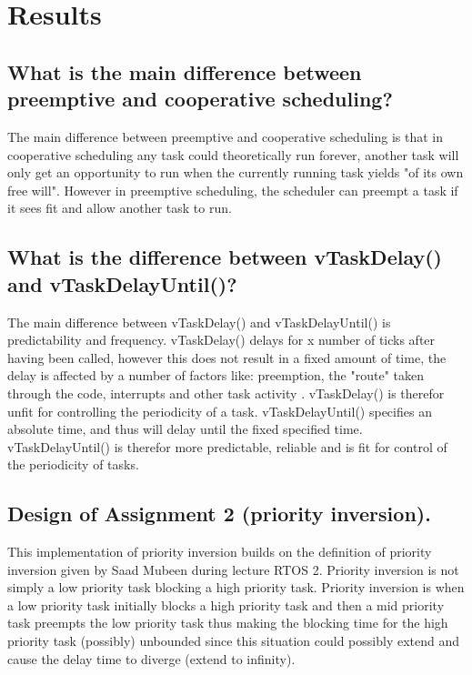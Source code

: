 \section{Results}
\label{section:results}

\subsection{What is the main difference between preemptive and cooperative scheduling?}
The main difference between preemptive and cooperative scheduling is that in cooperative scheduling any task could theoretically run forever, another task will only get an opportunity to run when the currently running task yields "of its own free will". However in preemptive scheduling, the scheduler can preempt a task if it sees fit and allow another task to run.

\subsection{What is the difference between vTaskDelay() and vTaskDelayUntil()?}
The main difference between vTaskDelay() and vTaskDelayUntil() is predictability and frequency. vTaskDelay() delays for x number of ticks after having been called, however this does not result in a fixed amount of time, the delay is affected by a number of factors like: preemption, the "route" taken through the code, interrupts and other task activity \cite{VTaskDelay2023}\cite{VTaskDelayUntil2023}. vTaskDelay() is therefor unfit for controlling the periodicity of a task. vTaskDelayUntil() specifies an absolute time, and thus will delay until the fixed specified time. vTaskDelayUntil() is therefor more predictable, reliable and is fit for control of the periodicity of tasks.

\subsection{Design of Assignment 2 (priority inversion).}
This implementation of priority inversion builds on the definition of priority inversion given by Saad Mubeen during lecture RTOS 2\cite{mubeenLectureRTOSII2023}. Priority inversion is not simply a low priority task blocking a high priority task. Priority inversion is when a low priority task initially blocks a high priority task and then a mid priority task preempts the low priority task thus making the blocking time for the high priority task (possibly) unbounded since this situation could possibly extend and cause the delay time to diverge (extend to infinity).

